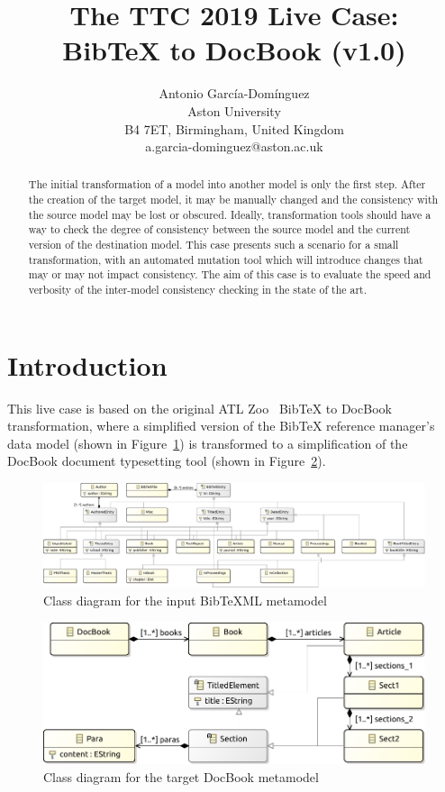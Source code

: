 \documentclass[a4paper]{scrartcl}
\title{The TTC 2019 Live Case:\\BibTeX to DocBook (v1.0)}
\author{
  Antonio García-Domínguez\\
  Aston University\\
  B4 7ET, Birmingham, United Kingdom\\
  a.garcia-dominguez@aston.ac.uk
}
\begin{document}
\maketitle

\begin{abstract}
  The initial transformation of a model into another model is only the first
  step. After the creation of the target model, it may be manually changed and
  the consistency with the source model may be lost or obscured. Ideally,
  transformation tools should have a way to check the degree of consistency
  between the source model and the current version of the destination model.
  This case presents such a scenario for a small transformation, with an
  automated mutation tool which will introduce changes that may or may not
  impact consistency. The aim of this case is to evaluate the speed and
  verbosity of the inter-model consistency checking in the state of the art.
\end{abstract}

\section{Introduction}

This live case is based on the original ATL Zoo~\cite{atlzoo} BibTeX to DocBook
transformation, where a simplified version of the BibTeX reference manager's
data model (shown in Figure~\ref{fig:bibtex-mm}) is transformed to a
simplification of the DocBook document typesetting tool (shown in
Figure~\ref{fig:docbook-mm}).

\begin{figure}
  \centering
  \includegraphics[width=\textheight]{bibtex}
  \caption{Class diagram for the input BibTeXML metamodel}
  \label{fig:bibtex-mm}
\end{figure}

\begin{figure}
  \centering
  \includegraphics[width=.7\textwidth]{docbook}
  \caption{Class diagram for the target DocBook metamodel}
  \label{fig:docbook-mm}
\end{figure}
\end{document}
